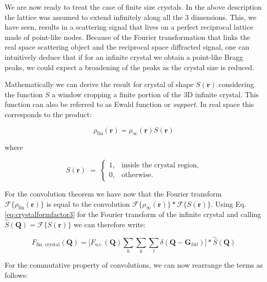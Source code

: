 We are now ready to treat the case of finite size crystals. In the above description the lattice was assumed to extend 
infinitely along all the 3 dimensions. This, we have seen, results in a scattering signal that lives on a perfect reciprocal 
lattice made of point-like nodes. Because of the Fourier transformation that links the real space scattering object and 
the reciprocal space diffracted signal, one can intuitively deduce that if for an infinite crystal we obtain a point-like 
Bragg peaks, we could expect a broadening of the peaks as the crystal size is reduced. 

Mathematically we can derive the result for crystal of shape $S(\mathbf r)$ considering the function $S$ a window cropping 
a finite portion of the 3D infinite crystal. This function can also be referred to as Ewald function \cite{Ewald_1940} or \textit{support}.
 In real space this corresponds to the product: 


\begin{equation}
    \rho_{\text{fin}}(\mathbf{r}) = \rho_{\infty}(\mathbf{r}) S(\mathbf{r})
    \label{eq:window}
\end{equation}

where 

\begin{equation}
    S(\mathbf r) \;=\;
    \begin{cases}
    1, & \text{inside the crystal region}
    , \\[6pt]
    0, & \text{otherwise}.
    \end{cases}
    \label{eq:shape_function_general}
\end{equation}
    
For the convolution theorem we have now that the Fourier transform $\mathcal{F\{}{\rho_{\text{fin}}(\mathbf{r})\}}$ is 
equal to the convolution $ \mathcal{F\{}{\rho_{\infty}(\mathbf{r})\} \ast \mathcal{F\{}S(\mathbf{r})\}}$. 
Using Eq.\ref{eq:crystalformfactor3} for the Fourier transform of the infinite crystal and calling $\widehat S(\mathbf{Q})= \mathcal{F} \{S(\mathbf{r})\}$ 
we can therefore write: 

\begin{equation}
    F_{\text{fin. crystal}}(\mathbf{Q}) = \Big[ F_{\text{u.c.}}(\mathbf{Q}) 
    \sum_{h} \sum_{k} \sum_{l} 
    \delta\!\left(\mathbf Q - \mathbf{G}_{hkl}\right) \Big] \ast \widehat S(\mathbf{Q})
    \label{eq:fin_cryst1}
\end{equation}

For the commutative property of convolutions, we can now rearrange the terms as follows: 

